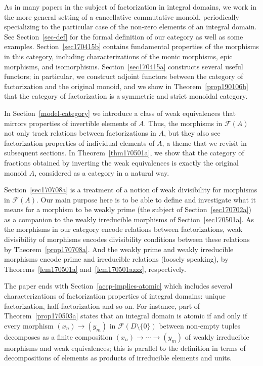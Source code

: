 \documentclass[reqno]{amsart}
\theoremstyle{plain}
\theoremstyle{definition}
\newcommand{\cat}[1]{\mathcal{#1}}
\newcommand{\catf}{\cat{F}}
\numberwithin{equation}{lem}
\begin{document}
As in many papers in the subject of factorization in integral domains,
we work in the more general
setting of a cancellative commutative monoid, periodically specializing to the particular case of 
the non-zero elements of an integral domain. 
See Section~\ref{sec-def} for the formal definition 
of our category
as well as some examples.
Section~\ref{sec170415b} contains fundamental properties of the morphisms in this category,
including characterizations of the monic morphisms, epic morphisms, and isomorphisms.
Section~\ref{sec170415a} constructs several useful functors; in particular, we construct adjoint functors
between the category of factorization and the original monoid, 
and we show in Theorem~\ref{prop190106b} that the category of factorization is a symmetric and strict monoidal category.

In 
Section~\ref{model-category} we 
introduce a class of weak equivalences
that mirrors properties of 
invertible
elements of $A$. 
Thus, the morphisms in $\catf(A)$ not only track relations between
factorizations in $A$, but they also see factorization properties of individual elements of $A$,
a theme that we revisit in subsequent sections.
In Theorem~\ref{thm170501a}, we show that the 
category 
of fractions obtained by inverting the weak equivalences
is exactly the original monoid $A$, considered as a category in a natural way.

Section~\ref{sec170708a} is a treatment of a notion of 
weak divisibility
for morphisms in $\catf(A)$.
Our main purpose here
is to be able to define and investigate
what it means for a morphism to be 
weakly prime
(the subject of
Section~\ref{sec170702a}) as a companion to the 
weakly irreducible
morphisms of
Section~\ref{sec170501a}. As the morphisms in our category encode relations between factorizations,
weak divisibility of morphisms encodes divisibility conditions between these relations
by Theorem~\ref{prop170708a}. And
the 
weakly prime and weakly irreducible
morphisms encode prime and irreducible relations (loosely speaking), 
by Theorems~\ref{lem170501a} and~\ref{lem170501azzz},
respectively.

The paper ends with
Section~\ref{accp-implies-atomic} which 
includes several characterizations of factorization properties of integral domains: 
unique factorization, half-factorization and so on. 
For instance, part of Theorem~\ref{prop170503a} states that an integral domain is atomic
if and only if every morphism $(x_n)\to(y_m)$ in $\catf(D \setminus \{0\})$ between non-empty tuples decomposes as 
a finite composition
$(x_n)\to\cdots\to(y_m)$ of 
weakly irreducible
morphisms and weak equivalences; this is parallel to the definition in terms of 
decompositions of elements 
as products
of 
irreducible elements
and units.
\end{document}
